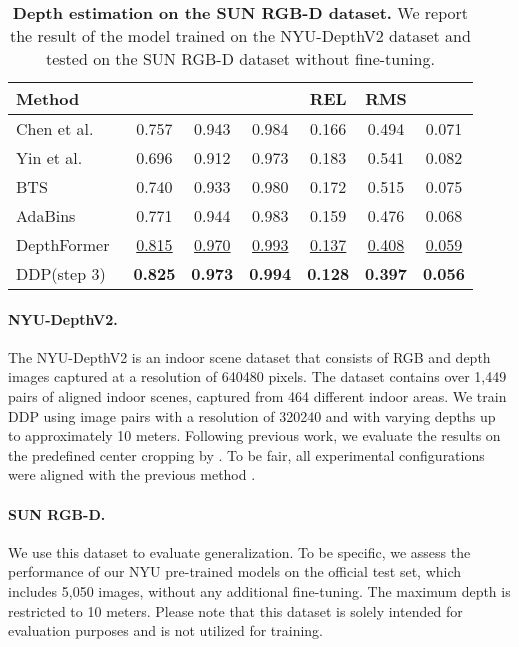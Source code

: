 \documentclass[10pt,twocolumn,letterpaper]{article}
\newcommand{\ours}[0]{DDP\xspace}
\begin{document}
\begin{table}[t!]
\centering
\footnotesize
\setlength{\tabcolsep}{1.25mm}
\begin{tabular}{l|ccc|ccc}
Method &  &  &  & REL  & RMS  &  \\
\hline
Chen et al. & 0.757 & 0.943 & 0.984 & 0.166 & 0.494 & 0.071 \\
Yin et al.~\cite{yin2019enforcing}  & 0.696 & 0.912 & 0.973 & 0.183 & 0.541 & 0.082 \\
BTS~\cite{lee2019big}  & 0.740 & 0.933 & 0.980 & 0.172 & 0.515 & 0.075 \\
AdaBins~\cite{bhat2021adabins}  & 0.771 & 0.944 & 0.983 & 0.159 & 0.476 & 0.068 \\
DepthFormer~\cite{li2022depthformer} & \underline{0.815} & \underline{0.970} & \underline{0.993} & \underline{0.137} & \underline{0.408} & \underline{0.059} \\
\rowcolor{gray!10} 
\ours (step 3) & \textbf{0.825} & \textbf{0.973} & \textbf{0.994} & \textbf{0.128} & \textbf{0.397} & \textbf{0.056} \\
\end{tabular}
\vspace{0.5em}
\caption{\textbf{Depth estimation on the SUN RGB-D dataset.}
We report the result of the model trained on the NYU-DepthV2 dataset and tested on the SUN RGB-D dataset without fine-tuning.}
\label{tab:exp:depth:sun}
\end{table}

\paragraph{NYU-DepthV2.}
The NYU-DepthV2 is an indoor scene dataset that consists of RGB and depth images captured at a resolution of 640480 pixels. 
The dataset contains over 1,449 pairs of aligned indoor scenes, captured from 464 different indoor areas.
We train \ours using image pairs with a resolution of 320240 and with varying depths up to approximately 10 meters.
Following previous work, we evaluate the results on the predefined center cropping by \cite{eigen2014depth}.
To be fair, all experimental configurations were aligned with the previous method \cite{li2022depthformer}.


\paragraph{SUN RGB-D.}
We use this dataset \cite{song2015sun} to evaluate generalization. 
To be specific, we assess the performance of our NYU pre-trained models on the official test set, which includes 5,050 images, without any additional fine-tuning. 
The maximum depth is restricted to 10 meters. 
Please note that this dataset is solely intended for evaluation purposes and is not utilized for training.
\end{document}
